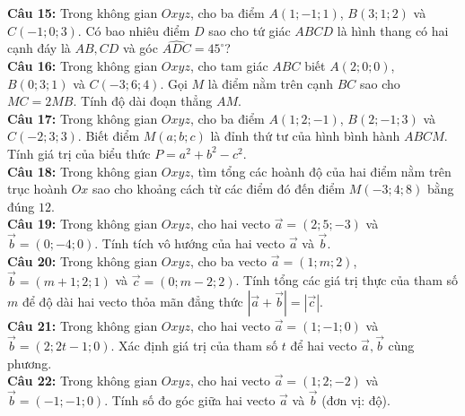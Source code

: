 \documentclass[12pt]{article}
\begin{document}
	
	\vspace{3mm}
	\noindent \textbf{Câu 15:} Trong không gian $Oxyz$, cho ba điểm $A(1; -1; 1)$, $B(3; 1; 2)$ và $C(-1; 0; 3)$. Có bao nhiêu điểm $D$ sao cho tứ giác $ABCD$ là hình thang có hai cạnh đáy là $AB, CD$ và góc $\widehat{ADC} = 45^\circ$? \\
	
	
	\vspace{3mm}
	\noindent \textbf{Câu 16:} Trong không gian $Oxyz$, cho tam giác $ABC$ biết $A(2; 0; 0)$, $B(0; 3; 1)$ và $C(-3; 6; 4)$. Gọi $M$ là điểm nằm trên cạnh $BC$ sao cho $MC = 2MB$. Tính độ dài đoạn thẳng $AM$. \\
	
	
	\vspace{3mm}
	\noindent \textbf{Câu 17:} Trong không gian $Oxyz$, cho ba điểm $A(1; 2; -1)$, $B(2; -1; 3)$ và $C(-2; 3; 3)$. Biết điểm $M(a; b; c)$ là đỉnh thứ tư của hình bình hành $ABCM$. Tính giá trị của biểu thức $P = a^2 + b^2 - c^2$. \\
	
	
	\vspace{3mm}
	\noindent \textbf{Câu 18:} Trong không gian $Oxyz$, tìm tổng các hoành độ của hai điểm nằm trên trục hoành $Ox$ sao cho khoảng cách từ các điểm đó đến điểm $M(-3; 4; 8)$ bằng đúng $12$. \\
	
	
	\vspace{3mm}
	\noindent \textbf{Câu 19:} Trong không gian $Oxyz$, cho hai vecto $\vec{a} = (2; 5; -3)$ và $\vec{b} = (0; -4; 0)$. Tính tích vô hướng của hai vecto $\vec{a}$ và $\vec{b}$. \\
	
	
	\vspace{3mm}
	\noindent \textbf{Câu 20:} Trong không gian $Oxyz$, cho ba vecto $\vec{a} = (1; m; 2)$, $\vec{b} = (m+1; 2; 1)$ và $\vec{c} = (0; m-2; 2)$. Tính tổng các giá trị thực của tham số $m$ để độ dài hai vecto thỏa mãn đẳng thức $|\vec{a} + \vec{b}| = |\vec{c}|$. \\
	
	
	\vspace{3mm}
	\noindent \textbf{Câu 21:} Trong không gian $Oxyz$, cho hai vecto $\vec{a} = (1; -1; 0)$ và $\vec{b} = (2; 2t-1; 0)$. Xác định giá trị của tham số $t$ để hai vecto $\vec{a}, \vec{b}$ cùng phương. \\
	
	
	\vspace{3mm}
	\noindent \textbf{Câu 22:} Trong không gian $Oxyz$, cho hai vecto $\vec{a} = (1; 2; -2)$ và $\vec{b} = (-1; -1; 0)$. Tính số đo góc giữa hai vecto $\vec{a}$ và $\vec{b}$ (đơn vị: độ). \\
	
\end{document}
